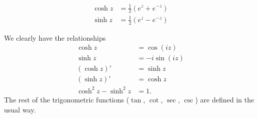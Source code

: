 \begin{definition}{}{}
    \begin{align*}
        \cosh z &= \frac{1}{2}(e^z + e^{-z})\\
        \sinh z &= \frac{1}{2}(e^z - e^{-z})
    \end{align*}
\end{definition}
We clearly have the relationships
\begin{align*}
    \cosh z &= \cos(iz)\\
    \sinh z &= -i\sin(iz)\\
    (\cosh z)' &= \sinh z\\
    (\sinh z)' &= \cosh z\\
    \cosh^2 z - \sinh^2 z &= 1.
\end{align*}
The rest of the trigonometric functions (\(\tan\), \(\cot\), \(\sec\), \(\csc\)) are defined in the usual way.

